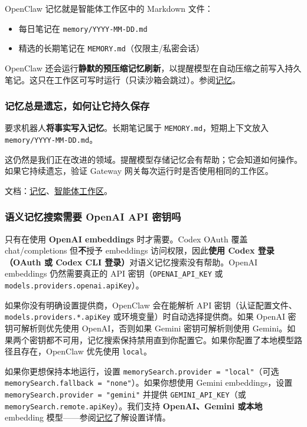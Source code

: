 OpenClaw 记忆就是智能体工作区中的 Markdown 文件：

\begin{itemize}
  \item 每日笔记在 \texttt{memory/YYYY-MM-DD.md}
  \item 精选的长期笔记在 \texttt{MEMORY.md}（仅限主/私密会话）
\end{itemize}


OpenClaw 还会运行\textbf{静默的预压缩记忆刷新}，以提醒模型在自动压缩之前写入持久笔记。这只在工作区可写时运行（只读沙箱会跳过）。参阅\href{/concepts/memory}{记忆}。

\subsubsection{记忆总是遗忘，如何让它持久保存}


要求机器人\textbf{将事实写入记忆}。长期笔记属于 \texttt{MEMORY.md}，短期上下文放入 \texttt{memory/YYYY-MM-DD.md}。

这仍然是我们正在改进的领域。提醒模型存储记忆会有帮助；它会知道如何操作。如果它持续遗忘，验证 Gateway 网关每次运行时是否使用相同的工作区。

文档：\href{/concepts/memory}{记忆}、\href{/concepts/agent-workspace}{智能体工作区}。

\subsubsection{语义记忆搜索需要 OpenAI API 密钥吗}


只有在使用 \textbf{OpenAI embeddings} 时才需要。Codex OAuth 覆盖 chat/completions 但\textbf{不}授予 embeddings 访问权限，因此\textbf{使用 Codex 登录（OAuth 或 Codex CLI 登录）}对语义记忆搜索没有帮助。OpenAI embeddings 仍然需要真正的 API 密钥（\texttt{OPENAI\_API\_KEY} 或 \texttt{models.providers.openai.apiKey}）。

如果你没有明确设置提供商，OpenClaw 会在能解析 API 密钥（认证配置文件、\texttt{models.providers.*.apiKey} 或环境变量）时自动选择提供商。如果 OpenAI 密钥可解析则优先使用 OpenAI，否则如果 Gemini 密钥可解析则使用 Gemini。如果两个密钥都不可用，记忆搜索保持禁用直到你配置它。如果你配置了本地模型路径且存在，OpenClaw 优先使用 \texttt{local}。

如果你更想保持本地运行，设置 \texttt{memorySearch.provider = "local"}（可选 \texttt{memorySearch.fallback = "none"}）。如果你想使用 Gemini embeddings，设置 \texttt{memorySearch.provider = "gemini"} 并提供 \texttt{GEMINI\_API\_KEY}（或 \texttt{memorySearch.remote.apiKey}）。我们支持 \textbf{OpenAI、Gemini 或本地} embedding 模型——参阅\href{/concepts/memory}{记忆}了解设置详情。

